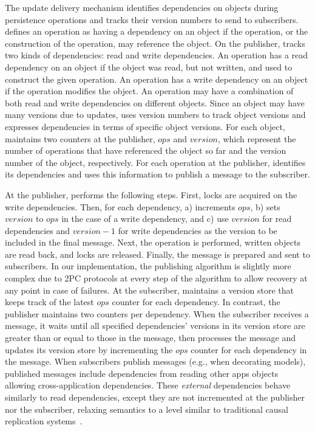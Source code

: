 The update delivery mechanism identifies dependencies on objects during persistence
operations and tracks their version numbers to send to subscribers.  \synapse defines an
operation as having a dependency on an object if the operation, or the
construction of the operation, may reference the object.  On the publisher,
\synapse tracks two kinds of dependencies: read and write dependencies.  An
operation has a read dependency on an object if the object was read,
but not written, and used to
 construct the given operation.  An operation has a write dependency
on an object if the operation modifies the object.  An operation may have a
combination of both read and write dependencies on different objects.
Since an object may have many
versions due to updates, \synapse uses version numbers to track object
versions and expresses dependencies in terms of specific object versions.  For
each object, \synapse maintains two counters at the publisher, $ops$ and
$version$, which represent the number of operations that have referenced the
object so far and the version number of the object, respectively.  For each
operation at the publisher, \synapse identifies its dependencies and uses this
information to publish a message to the subscriber.  

At the publisher, \synapse performs the following steps.  First,
locks are acquired on the write dependencies. Then, 
for each dependency, a) \synapse increments $ops$, b) sets $version$ to $ops$
in the case of a write dependency, and c) use $version$ for read dependencies
and $version - 1$ for write dependencies as the version to be included
in the final message.  Next, the operation is performed, written objects are
read back, and locks are released. Finally, the message is prepared and sent
to subscribers.  In our implementation, the publishing algorithm is slightly
more complex due to 2PC protocols at every step of the algorithm to allow
recovery at any point in case of failures.  At the subscriber, \synapse
maintains a version store that keeps track of the latest $ops$ counter for
each dependency. In contrast, the publisher maintains two
counters per dependency.  When the subscriber receives a message, it waits
until all specified dependencies' versions in its version store are greater than
or equal to those in the message,
then processes the message and updates its version store
by incrementing the $ops$ counter for each dependency in the message. 
When subscribers publish messages (e.g., when decorating models), published
messages include dependencies from reading other apps objects allowing
cross-application dependencies.  These {\em external} dependencies behave
similarly to read dependencies, except they are not incremented at the publisher
nor the subscriber, relaxing semantics to a level similar to traditional causal
replication systems~\cite{cops,eiger}.

